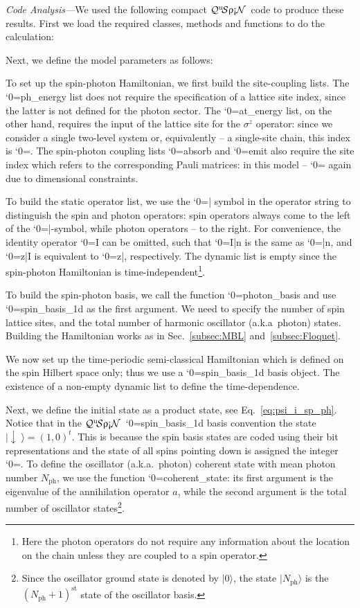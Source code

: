 \documentclass{SciPost}
\newcommand\0{\scalebox{-1}[1]{0}}
\let\svttfamily\ttfamily
\renewcommand\ttfamily{\svttfamily\catcode`0=\active }
\renewcommand\texttt{\bgroup\ttfamily\texttthelp}
\def\texttthelp#1{#1\egroup}
\newcommand{\qspin}{$\mathcal{Q}^{\mathrm{u}}\!\mathcal{S}\uprho\mathrm{\text{\textexclamdown}}\mathcal{N}$}
\begin{document}
\emph{Code Analysis---}We used the following compact \qspin\ code to produce these results. First we load the required classes, methods and functions to do the calculation:

%
Next, we define the model parameters as follows:

%
To set up the spin-photon Hamiltonian, we first build the site-coupling lists. The \texttt{ph\_energy} list does not require the specification of a lattice site index, since the latter is not defined for the photon sector. The \texttt{at\_energy} list, on the other hand, requires the input of the lattice site for the $\sigma^z$ operator: since we consider a single two-level system or, equivalently -- a single-site chain, this index is \texttt{0}. The spin-photon coupling lists \texttt{absorb} and \texttt{emit} also require the site index which refers to the corresponding Pauli matrices: in this model -- \texttt{0} again due to dimensional constraints.
%  

To build the static operator list, we use the \texttt{|} symbol in the operator string to distinguish the spin and photon operators: spin operators always come to the left of the \texttt{|}-symbol, while photon operators -- to the right. For convenience, the identity operator \texttt{I} can be omitted, such that \texttt{I|n} is the same as \texttt{|n}, and \texttt{z|I} is equivalent to \texttt{z|}, respectively. The dynamic list is empty since the spin-photon Hamiltonian is time-independent\footnote{Here the photon operators do not require any information about the location on the chain unless they are coupled to a spin operator.}.
%  

To build the spin-photon basis, we call the function \texttt{photon\_basis} and use \texttt{spin\_basis\_1d} as the first argument. We need to specify the number of spin lattice sites, and the total number of harmonic oscillator (a.k.a~photon) states. Building the Hamiltonian works as in Sec.~\ref{subsec:MBL} and~\ref{subsec:Floquet}.

We now set up the time-periodic semi-classical Hamiltonian which is defined on the spin Hilbert space only; thus we use a \texttt{spin\_basis\_1d} basis object. The existence of a non-empty dynamic list to define the time-dependence.
%

Next, we define the initial state as a product state, see Eq.~\eqref{eq:psi_i_sp_ph}. Notice that in the \qspin\ \texttt{spin\_basis\_1d} basis convention the state $|\downarrow\;\rangle = (1,0)^t$. This is because the spin basis states are coded using their bit representations and the state of all spins pointing down is assigned the integer \texttt{0}. To define the oscillator (a.k.a.~photon) coherent state with mean photon number $N_\mathrm{ph}$, we use the function \texttt{coherent\_state}: its first argument is the eigenvalue of the annihilation operator $a$, while the second argument is the total number of oscillator states\footnote{Since the oscillator ground state is denoted by $|0\rangle$, the state $|N_\mathrm{ph}\rangle$ is the $(N_\mathrm{ph}+1)^\mathrm{st}$ state of the oscillator  basis.}.
\end{document}
